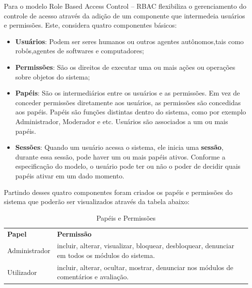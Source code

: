 \documentclass[12pt, a4paper]{report}
\begin{document}
Para \citep{sandhu1997} o modelo Role Based Access Control – RBAC flexibiliza o gerenciamento do controle de acesso através da adição de um componente que intermedeia usuários e permissões. Este, considera quatro componentes básicos:
\begin{itemize}
\item \textbf{Usuários}: Podem ser seres humanos ou outros agentes autônomos,tais como robôs,agentes de softwares e computadores;
\item \textbf{Permissões}: São os direitos de executar uma ou mais ações ou operações sobre objetos do sistema;
\item \textbf{Papéis}: São os intermediários entre os usuários e as permissões. Em vez de conceder permissões diretamente aos usuários, as permissões são concedidas aos papéis. Papéis são funções distintas dentro do sistema, como por exemplo Administrador, Moderador e etc. Usuários são associados a um ou mais papéis.  
\item \textbf{Sessões}: Quando um usuário acessa o sistema, ele inicia uma \textbf{sessão}, durante  essa  sessão, pode haver  um  ou  mais  papéis ativos. Conforme a especificação do modelo, o usuário pode ter ou não o poder de decidir quais papéis ativar em um dado momento.
\end{itemize}

Partindo desses quatro componentes foram criados os papéis e permissões do sistema que poderão ser visualizados através da tabela abaixo:

\begin{table}[h]
 \centering
 {\renewcommand\arraystretch{1.25}
 \begin{tabular}{ l l }
  \cline{1-1}\cline{2-2}  
    \multicolumn{1}{|p{3.850cm}|}{\textbf{Papel} \centering } &
    \multicolumn{1}{p{4.217cm}|}{\textbf{Permissão} \centering }
  \\  
  \cline{1-1}\cline{2-2}  
    \multicolumn{1}{|p{3.850cm}|}{Administrador} &
    \multicolumn{1}{p{4.217cm}|}{incluir, alterar, visualizar, bloquear, desbloquear, denunciar em todos os módulos do sistema.}
  \\  
  \cline{1-1}\cline{2-2}  
    \multicolumn{1}{|p{3.850cm}|}{Utilizador} &
    \multicolumn{1}{p{4.217cm}|}{incluir, alterar, ocultar, mostrar, denunciar nos módulos de comentários e avaliação.}
  \\  
  \hline
 \end{tabular} }
 \caption{Papéis e Permissões}
\end{table}
\end{document}
